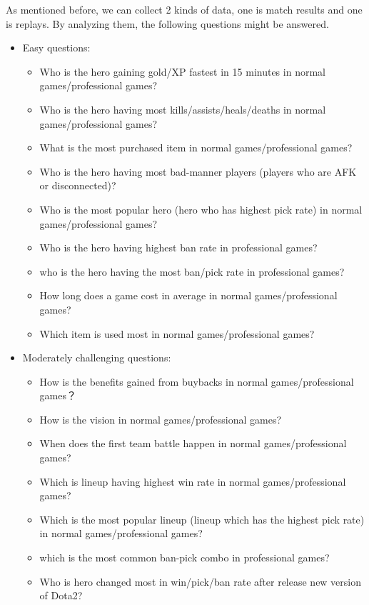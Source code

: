 \documentclass{article}
\begin{document}
As mentioned before, we can collect 2 kinds of data, one is match results and one is replays.
By analyzing them, the following questions might be answered.

\begin{itemize}
    \item Easy questions:
    \begin{itemize}
        \item Who is the hero gaining gold/XP fastest in 15 minutes in normal games/professional games?
        \item Who is the hero having most kills/assists/heals/deaths in normal games/professional games?
        \item What is the most purchased item in normal games/professional games?
        \item Who is the hero having most bad-manner players (players who are AFK or disconnected)?
        \item Who is the most popular hero (hero who has highest pick rate) in normal games/professional games?
        \item Who is the hero having highest ban rate in professional games?
        \item who is the hero having the most ban/pick rate in professional games?
        \item How long does a game cost in average in normal games/professional games?
        \item Which item is used most in normal games/professional games?
    \end{itemize}
    \item Moderately challenging questions:
    \begin{itemize}
        \item How is the benefits gained from buybacks in normal games/professional games？
        \item How is the vision in normal games/professional games?
        \item When does the first team battle happen in normal games/professional games?
        \item Which is lineup having highest win rate in normal games/professional games?
        \item Which is the most popular lineup (lineup which has the highest pick rate) in normal games/professional games?
        \item which is the most common ban-pick combo in professional games?
        \item Who is hero changed most in win/pick/ban rate after release new version of Dota2?

\end{itemize}
\end{itemize}
\end{document}
